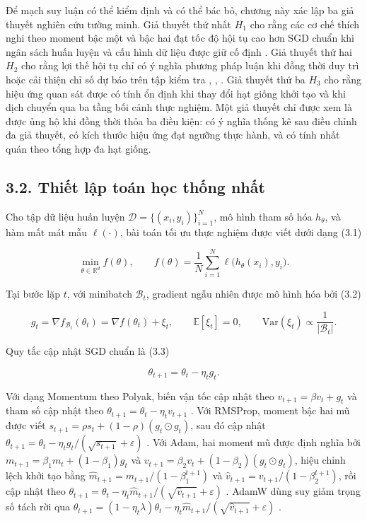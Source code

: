 \documentclass[a4paper,12pt]{article}
\begin{document}
Để mạch suy luận có thể kiểm định và có thể bác bỏ, chương này xác lập ba giả thuyết nghiên cứu tường minh. Giả thuyết thứ nhất $H_1$ cho rằng các cơ chế thích nghi theo moment bậc một và bậc hai đạt tốc độ hội tụ cao hơn SGD chuẩn khi ngân sách huấn luyện và cấu hình dữ liệu được giữ cố định \cite{ref1,ref2,ref3,ref4,ref5}. Giả thuyết thứ hai $H_2$ cho rằng lợi thế hội tụ chỉ có ý nghĩa phương pháp luận khi đồng thời duy trì hoặc cải thiện chỉ số dự báo trên tập kiểm tra \cite{ref8}, \cite{ref14}, \cite{ref15}. Giả thuyết thứ ba $H_3$ cho rằng hiệu ứng quan sát được có tính ổn định khi thay đổi hạt giống khởi tạo và khi dịch chuyển qua ba tầng bối cảnh thực nghiệm. Một giả thuyết chỉ được xem là được ủng hộ khi đồng thời thỏa ba điều kiện: có ý nghĩa thống kê sau điều chỉnh đa giả thuyết, có kích thước hiệu ứng đạt ngưỡng thực hành, và có tính nhất quán theo tổng hợp đa hạt giống.

\subsection{3.2. Thiết lập toán học thống nhất}

Cho tập dữ liệu huấn luyện $\mathcal{D}=\{(x_i,y_i)\}_{i=1}^N$, mô hình tham số hóa $h_\theta$, và hàm mất mát mẫu $\ell(\cdot)$, bài toán tối ưu thực nghiệm được viết dưới dạng (3.1)

\begin{equation}
\min_{\theta\in\mathbb{R}^d} f(\theta), \qquad f(\theta)=\frac{1}{N}\sum_{i=1}^N \ell\big(h_\theta(x_i),y_i\big).\tag{3.1}
\end{equation}

Tại bước lặp $t$, với minibatch $\mathcal{B}_t$, gradient ngẫu nhiên được mô hình hóa bởi (3.2)

\begin{equation}
g_t = \nabla f_{\mathcal{B}_t}(\theta_t) = \nabla f(\theta_t) + \xi_t, \qquad
\mathbb{E}[\xi_t]=0, \qquad \mathrm{Var}(\xi_t)\propto \frac{1}{|\mathcal{B}_t|}.\tag{3.2}
\end{equation}

Quy tắc cập nhật SGD chuẩn là (3.3)

\begin{equation}
θ_{t+1}=θ_t-η_t g_t.\tag{3.3}
\end{equation}

Với dạng Momentum theo Polyak, biến vận tốc cập nhật theo $v_{t+1}=\beta v_t+g_t$ và tham số cập nhật theo $\theta_{t+1}=\theta_t-\eta_t v_{t+1}$ \cite{ref2}. Với RMSProp, moment bậc hai mũ được viết $s_{t+1}=\rho s_t+(1-\rho)(g_t\odot g_t)$, sau đó cập nhật $\theta_{t+1}=\theta_t-\eta_t g_t/(\sqrt{s_{t+1}}+\varepsilon)$ \cite{ref3}. Với Adam, hai moment mũ được định nghĩa bởi $m_{t+1}=\beta_1m_t+(1-\beta_1)g_t$ và $v_{t+1}=\beta_2v_t+(1-\beta_2)(g_t\odot g_t)$, hiệu chỉnh lệch khởi tạo bằng $\hat m_{t+1}=m_{t+1}/(1-\beta_1^{t+1})$ và $\hat v_{t+1}=v_{t+1}/(1-\beta_2^{t+1})$, rồi cập nhật theo $\theta_{t+1}=\theta_t-\eta_t\hat m_{t+1}/(\sqrt{\hat v_{t+1}}+\varepsilon)$ \cite{ref4}. AdamW dùng suy giảm trọng số tách rời qua $\theta_{t+1}=(1-\eta_t\lambda)\theta_t-\eta_t\hat m_{t+1}/(\sqrt{\hat v_{t+1}}+\varepsilon)$ \cite{ref5}.
\end{document}
